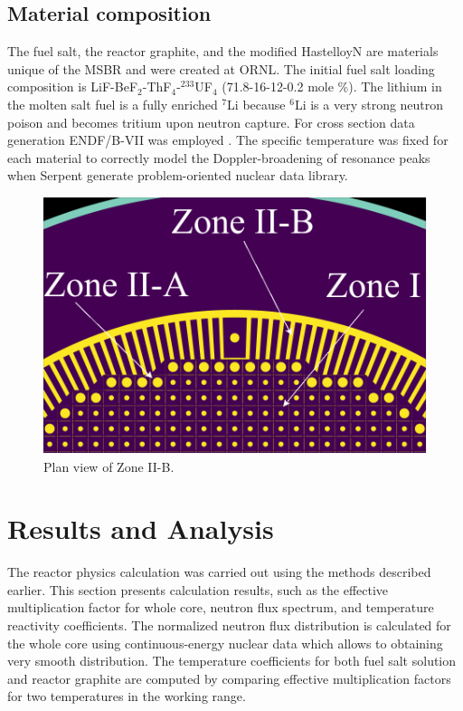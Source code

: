 \documentclass{anstrans}
\begin{document}
\subsection{Material composition}
The fuel salt, the reactor graphite, and the modified HastelloyN are materials unique of the MSBR and were created at \gls{ORNL}. The initial fuel salt loading composition is LiF-BeF$_2$-ThF$_4$-$^{233}$UF$_4$ (71.8-16-12-0.2 mole \%). The lithium in the molten salt fuel is a fully enriched $^{7}$Li because $^{6}$Li is a very strong neutron poison and becomes tritium upon neutron capture. For cross section data generation ENDF/B-VII was employed \cite{chadwick_endf/b-vii.0:_2006}. The specific temperature was fixed for each material to correctly model the Doppler-broadening of resonance peaks when Serpent generate problem-oriented nuclear data library.
\begin{figure}[htbp!] %
  \centering
  \includegraphics[width=0.96\linewidth]{figure_2_5.png}
  \caption{Plan view of Zone II-B.}
  \label{fig:zone2B}
\end{figure}
\FloatBarrier
\section{Results and Analysis}
The reactor physics calculation was carried out using the methods described earlier. This section presents calculation results, such as the effective multiplication factor for whole core, neutron flux spectrum, and temperature reactivity coefficients. The normalized neutron flux distribution is calculated for the whole core using continuous-energy nuclear data which allows to obtaining very smooth distribution. The temperature coefficients for both fuel salt solution and reactor graphite are computed by comparing effective multiplication factors for two temperatures in the working range.
 	
\end{document}
